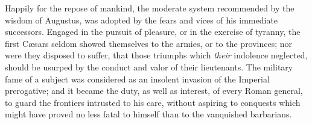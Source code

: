 Happily for the repose of mankind, the moderate system
recommended by the wisdom of Augustus, was adopted by the fears
and vices of his immediate successors. Engaged in the pursuit of
pleasure, or in the exercise of tyranny, the first Cæsars seldom
showed themselves to the armies, or to the provinces; nor were
they disposed to suffer, that those triumphs which \textit{their}
indolence neglected, should be usurped by the conduct and valor
of their lieutenants. The military fame of a subject was
considered as an insolent invasion of the Imperial prerogative;
and it became the duty, as well as interest, of every Roman
general, to guard the frontiers intrusted to his care, without
aspiring to conquests which might have proved no less fatal to
himself than to the vanquished barbarians.\footnotemark[5]


